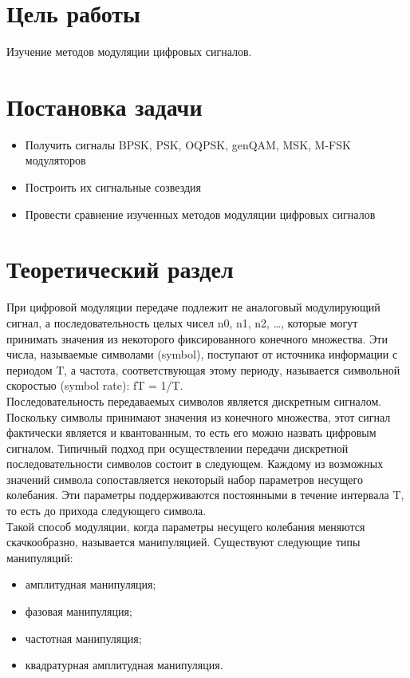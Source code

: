 \documentclass[a4paper]{article}
\begin{document}
\vfill %

\section{Цель работы}
 Изучение методов модуляции цифровых сигналов.

\section{Постановка задачи}
\begin{itemize}
	\item Получить сигналы BPSK, PSK, OQPSK, genQAM, MSK, M-FSK модуляторов
	\item Построить их сигнальные созвездия
	\item Провести сравнение изученных методов модуляции цифровых
	сигналов
\end{itemize}


\section{Теоретический раздел}
При цифровой модуляции передаче подлежит не аналоговый модулирующий сигнал, а последовательность целых чисел n0, n1, n2, …, которые могут принимать значения из некоторого фиксированного конечного множества. Эти числа, называемые символами (symbol), поступают от источника информации с периодом T, а частота, соответствующая этому периоду, называется символьной скоростью (symbol rate): fT = 1/T.\\

Последовательность передаваемых символов является дискретным сигналом. Поскольку символы принимают значения из конечного множества, этот сигнал фактически является и квантованным, то есть его можно назвать цифровым сигналом. Типичный подход при осуществлении передачи дискретной последовательности символов состоит в следующем. Каждому из возможных значений символа сопоставляется некоторый набор параметров несущего колебания. Эти параметры поддерживаются постоянными в течение интервала T, то есть до прихода следующего символа.\\

Такой способ модуляции, когда параметры несущего колебания меняются скачкообразно, называется манипуляцией. Существуют следующие типы манипуляций:
\begin{itemize}
	\item амплитудная манипуляция;
	\item фазовая манипуляция;
	\item частотная манипуляция;
	\item квадратурная амплитудная манипуляция.
\end{itemize}
\end{document}
